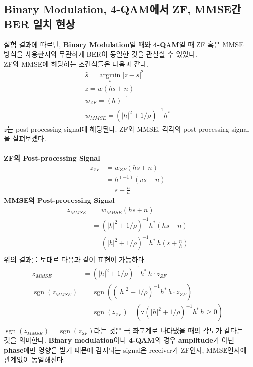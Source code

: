 \documentclass{article}
\newcommand{\bd}{\textbf} %
\providecommand{\abs}[1]{\lvert#1\rvert}
\newcommand{\sgn}{\operatorname{sgn}}
\begin{document}
\subsection{Binary Modulation, 4-QAM에서 ZF, MMSE간 BER 일치 현상}
실험 결과에 따르면, \bd{Binary Modulation}일 때와 \bd{4-QAM}일 때 ZF 혹은 MMSE 방식을 사용한지와 무관하게 BER이 동일한 것을 관찰할 수 있었다.\\
ZF와 MMSE에 해당하는 조건식들은 다음과 같다.
\begin{gather}
\hat{s}=\operatorname*{argmin}_s \abs{z-s}^2\\
z=w(hs+n)\\
w_{ZF}=(h)^{-1}\\
w_{MMSE}=(\abs{h}^2+1/\rho)^{-1}h^*
\end{gather}
$z$는 post-processing signal에 해당된다. ZF와 MMSE, 각각의 post-processing signal을 살펴보겠다.\\
\\
\bd{ZF의 Post-processing Signal}
\begin{equation}
\begin{split}
z_{ZF}&=w_{ZF}(hs+n)\\
&=h^(-1)(hs+n)\\
&=s+\frac{n}{h}
\end{split}
\end{equation}
\bd{MMSE의 Post-processing Signal}
\begin{equation}
\begin{split}
z_{MMSE}&=w_{MMSE}(hs+n)\\
&=(\abs{h}^2+1/\rho)^{-1}h^*(hs+n)\\
&=(\abs{h}^2+1/\rho)^{-1}h^*\, h(s+\frac{n}{h})\\
\end{split}
\end{equation}
위의 결과를 토대로 다음과 같이 표현이 가능하다.
\begin{equation}
\begin{split}
z_{MMSE}&=(\abs{h}^2+1/\rho)^{-1}h^*\,h\cdot z_{ZF}\\
\sgn(z_{MMSE}) &= \sgn((\abs{h}^2+1/\rho)^{-1}h^*\,h\cdot z_{ZF})\\
&=\sgn(z_{ZF})\quad (\because (\abs{h}^2+1/\rho)^{-1}h^*\,h \geq 0) \\
\end{split}
\end{equation}
$\sgn(z_{MMSE})=\sgn(z_{ZF})$라는 것은 극 좌표계로 나타냈을 때의 각도가 같다는 것을 의미한다.  \bd{Binary modulation}이나 \bd{4-QAM}의 경우 \bd{amplitude}가 아닌 \bd{phase}에만 영향을 받기 때문에 감지되는 signal은 receiver가 ZF인지, MMSE인지에 관계없이 동일해진다.\\
\end{document}
